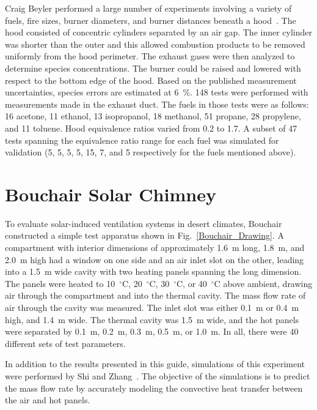 Craig Beyler performed a large number of experiments involving a variety of fuels, fire sizes, burner diameters, and burner distances beneath a hood~\cite{Beyler:Hood}.  The hood consisted of concentric cylinders separated by an air gap.  The inner cylinder was shorter than the outer and this allowed combustion products to be removed uniformly from the hood perimeter.  The exhaust gases were then analyzed to determine species concentrations. The burner could be raised and lowered with respect to the bottom edge of the hood.  Based on the published measurement uncertainties, species errors are estimated at 6~\%.  148 tests were performed with measurements made in the exhaust duct.  The fuels in those tests were as follows: 16 acetone, 11 ethanol, 13 isopropanol, 18 methanol, 51 propane, 28 propylene, and 11 toluene. Hood equivalence ratios varied from 0.2 to 1.7.  A subset of 47 tests spanning the equivalence ratio range for each fuel was simulated for validation (5, 5, 5, 5, 15, 7, and 5 respectively for the fuels mentioned above).


\section{Bouchair Solar Chimney}

To evaluate solar-induced ventilation systems in desert climates, Bouchair~\cite{Bouchair:Thesis} constructed a simple test apparatus shown in Fig.~\ref{Bouchair_Drawing}. A compartment with interior dimensions of approximately 1.6~m long, 1.8~m, and 2.0~m high had a window on one side and an air inlet slot on the other, leading into a 1.5~m wide cavity with two heating panels spanning the long dimension. The panels were heated to 10~$^\circ$C, 20~$^\circ$C, 30~$^\circ$C, or 40~$^\circ$C above ambient, drawing air through the compartment and into the thermal cavity. The mass flow rate of air through the cavity was measured. The inlet slot was either 0.1~m or 0.4~m high, and 1.4~m wide. The thermal cavity was 1.5~m wide, and the hot panels were separated by 0.1~m, 0.2~m, 0.3~m, 0.5~m, or 1.0~m. In all, there were 40 different sets of test parameters.

In addition to the results presented in this guide, simulations of this experiment were performed by Shi and Zhang~\cite{Shi:BE2016}. The objective of the simulations is to predict the mass flow rate by accurately modeling the convective heat transfer between the air and hot panels.

